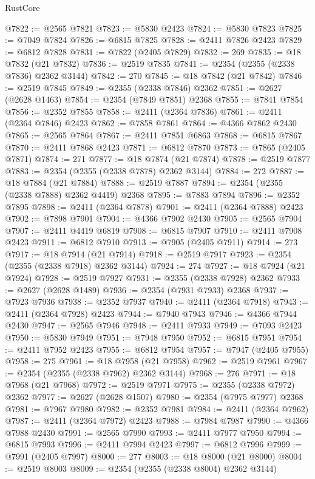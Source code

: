 \begin{lexlean}{RustCore}
\begin{coremodule}
@7822 := @2565 @7821
@7823 := @5830 @2423
@7824 := @5830 @7823
@7825 := @7049 @7824
@7826 := @6815 @7825
@7828 := @2411 @7826 @2423
@7829 := @6812 @7828
@7831 := @7822 (@2405 @7829)
@7832 := 269
@7835 := @18 @7832 (@21 @7832)
@7836 := @2519 @7835
@7841 := @2354 (@2355 (@2338 @7836) @2362 @3144)
@7842 := 270
@7845 := @18 @7842 (@21 @7842)
@7846 := @2519 @7845
@7849 := @2355 (@2338 @7846) @2362
@7851 := @2627 (@2628 @1463)
@7854 := @2354 (@7849 @7851) @2368
@7855 := @7841 @7854
@7856 := @2352 @7855
@7858 := @2411 (@2364 @7836)
@7861 := @2411 (@2364 @7846) @2423
@7862 := @7858 @7861
@7864 := @4366 @7862 @2430
@7865 := @2565 @7864
@7867 := @2411 @7851 @6863
@7868 := @6815 @7867
@7870 := @2411 @7868 @2423
@7871 := @6812 @7870
@7873 := @7865 (@2405 @7871)
@7874 := 271
@7877 := @18 @7874 (@21 @7874)
@7878 := @2519 @7877
@7883 := @2354 (@2355 (@2338 @7878) @2362 @3144)
@7884 := 272
@7887 := @18 @7884 (@21 @7884)
@7888 := @2519 @7887
@7894 := @2354 (@2355 (@2338 @7888) @2362 @4419) @2368
@7895 := @7883 @7894
@7896 := @2352 @7895
@7898 := @2411 (@2364 @7878)
@7901 := @2411 (@2364 @7888) @2423
@7902 := @7898 @7901
@7904 := @4366 @7902 @2430
@7905 := @2565 @7904
@7907 := @2411 @4419 @6819
@7908 := @6815 @7907
@7910 := @2411 @7908 @2423
@7911 := @6812 @7910
@7913 := @7905 (@2405 @7911)
@7914 := 273
@7917 := @18 @7914 (@21 @7914)
@7918 := @2519 @7917
@7923 := @2354 (@2355 (@2338 @7918) @2362 @3144)
@7924 := 274
@7927 := @18 @7924 (@21 @7924)
@7928 := @2519 @7927
@7931 := @2355 (@2338 @7928) @2362
@7933 := @2627 (@2628 @1489)
@7936 := @2354 (@7931 @7933) @2368
@7937 := @7923 @7936
@7938 := @2352 @7937
@7940 := @2411 (@2364 @7918)
@7943 := @2411 (@2364 @7928) @2423
@7944 := @7940 @7943
@7946 := @4366 @7944 @2430
@7947 := @2565 @7946
@7948 := @2411 @7933
@7949 := @7093 @2423
@7950 := @5830 @7949
@7951 := @7948 @7950
@7952 := @6815 @7951
@7954 := @2411 @7952 @2423
@7955 := @6812 @7954
@7957 := @7947 (@2405 @7955)
@7958 := 275
@7961 := @18 @7958 (@21 @7958)
@7962 := @2519 @7961
@7967 := @2354 (@2355 (@2338 @7962) @2362 @3144)
@7968 := 276
@7971 := @18 @7968 (@21 @7968)
@7972 := @2519 @7971
@7975 := @2355 (@2338 @7972) @2362
@7977 := @2627 (@2628 @1507)
@7980 := @2354 (@7975 @7977) @2368
@7981 := @7967 @7980
@7982 := @2352 @7981
@7984 := @2411 (@2364 @7962)
@7987 := @2411 (@2364 @7972) @2423
@7988 := @7984 @7987
@7990 := @4366 @7988 @2430
@7991 := @2565 @7990
@7993 := @2411 @7977 @7950
@7994 := @6815 @7993
@7996 := @2411 @7994 @2423
@7997 := @6812 @7996
@7999 := @7991 (@2405 @7997)
@8000 := 277
@8003 := @18 @8000 (@21 @8000)
@8004 := @2519 @8003
@8009 := @2354 (@2355 (@2338 @8004) @2362 @3144)

\end{coremodule}
\end{lexlean}
